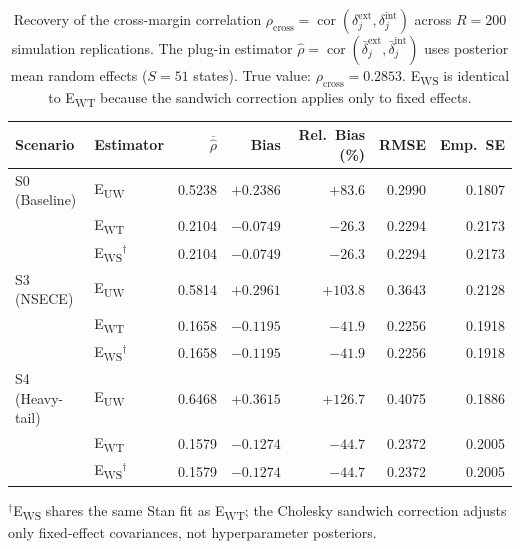 \begin{table}[t]
\centering
\caption{Recovery of the cross-margin correlation $\rho_{\mathrm{cross}} = \operatorname{cor}(\delta_j^{\mathrm{ext}}, \delta_j^{\mathrm{int}})$
  across $R = 200$ simulation replications. The plug-in estimator 
  $\hat{\rho} = \operatorname{cor}(\bar{\delta}_j^{\mathrm{ext}}, \bar{\delta}_j^{\mathrm{int}})$
  uses posterior mean random effects ($S = 51$ states). True value: $\rho_{\mathrm{cross}} = 0.2853$.
  E\textsubscript{WS} is identical to E\textsubscript{WT} because the sandwich correction applies only to fixed effects.}
\label{tab:rho-cross-sim}
\smallskip
\small
\begin{tabular}{@{}ll rrrrr@{}}
\toprule
Scenario & Estimator & $\overline{\hat{\rho}}$ & Bias & Rel.~Bias (\%) & RMSE & Emp.~SE \\
\midrule
S0 (Baseline)      & E\textsubscript{UW}                 & 0.5238 & $+0.2386$ & $+83.6$ & 0.2990 & 0.1807 \\
                   & E\textsubscript{WT}                 & 0.2104 & $-0.0749$ & $-26.3$ & 0.2294 & 0.2173 \\
                   & E\textsubscript{WS}$^{\dagger}$     & 0.2104 & $-0.0749$ & $-26.3$ & 0.2294 & 0.2173 \\
\midrule
S3 (NSECE)         & E\textsubscript{UW}                 & 0.5814 & $+0.2961$ & $+103.8$ & 0.3643 & 0.2128 \\
                   & E\textsubscript{WT}                 & 0.1658 & $-0.1195$ & $-41.9$ & 0.2256 & 0.1918 \\
                   & E\textsubscript{WS}$^{\dagger}$     & 0.1658 & $-0.1195$ & $-41.9$ & 0.2256 & 0.1918 \\
\midrule
S4 (Heavy-tail)    & E\textsubscript{UW}                 & 0.6468 & $+0.3615$ & $+126.7$ & 0.4075 & 0.1886 \\
                   & E\textsubscript{WT}                 & 0.1579 & $-0.1274$ & $-44.7$ & 0.2372 & 0.2005 \\
                   & E\textsubscript{WS}$^{\dagger}$     & 0.1579 & $-0.1274$ & $-44.7$ & 0.2372 & 0.2005 \\
\bottomrule
\end{tabular}

\medskip
{\footnotesize $^{\dagger}$E\textsubscript{WS} shares the same Stan fit as E\textsubscript{WT}; the Cholesky sandwich correction adjusts only fixed-effect covariances, not hyperparameter posteriors.}
\end{table}
